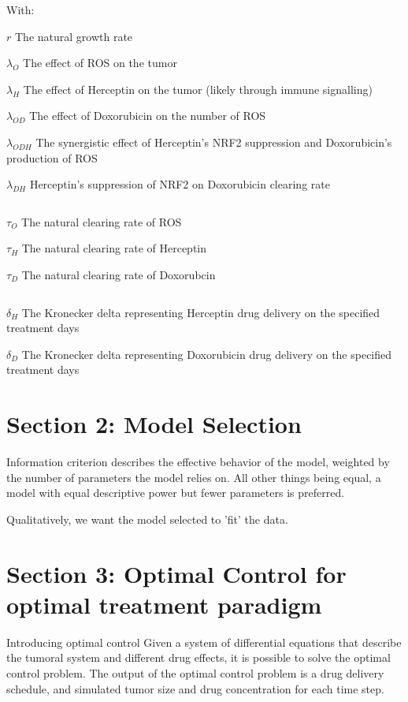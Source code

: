 \documentclass{article}
\begin{document}
With:


$ r $ The natural growth rate

$ \lambda_O $ The effect of ROS on the tumor 

$ \lambda_H $ The effect of Herceptin on the tumor (likely through immune signalling) 

$ \lambda_{OD} $ The effect of Doxorubicin on the number of ROS

$ \lambda_{ODH} $ The synergistic effect of Herceptin's NRF2 suppression and Doxorubicin's production of ROS

$ \lambda_{DH} $ Herceptin's suppression of NRF2 on Doxorubicin clearing rate 

$$
\;
\;
$$


$ \tau_O $ The natural clearing rate of ROS

$ \tau_H $ The natural clearing rate of Herceptin

$ \tau_D $ The natural clearing rate of Doxorubcin

$$
\;
\;
$$


$ \delta_H $ The Kronecker delta representing Herceptin drug delivery on the specified treatment days

$ \delta_D $ The Kronecker delta representing Doxorubicin drug delivery on the specified treatment days






\section{Section 2: Model Selection}


Information criterion describes the effective behavior of the model, weighted by the number of parameters the model relies on. All other things being equal, a model with equal descriptive power but fewer parameters is preferred. 

Qualitatively, we want the model selected to 'fit' the data. 




\section{Section 3: Optimal Control for optimal treatment paradigm}

Introducing optimal control
Given a system of differential equations that describe the tumoral system and different drug effects, it is possible to solve the optimal control problem. The output of the optimal control problem is a drug delivery schedule, and simulated tumor size and drug concentration for each time step. 
\end{document}
